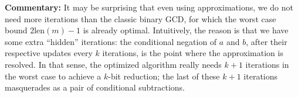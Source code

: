 \documentclass{llncs}
\newcommand{\bitlength}{\text{len}}
\begin{document}
\vspace{2ex}
\noindent\textsf{\textbf{Commentary:}} It may be surprising that even
using approximations, we do not need more iterations than the classic
binary GCD, for which the worst case bound $2\bitlength(m)-1$ is
already optimal. Intuitively, the reason is that we have some extra
``hidden'' iterations: the conditional negation of $a$ and $b$,
after their respective updates every $k$ iterations, is the point where
the approximation is resolved. In that sense, the optimized algorithm
really needs $k+1$ iterations in the worst case to achieve a $k$-bit
reduction; the last of these $k+1$ iterations masquerades as a
pair of conditional subtractions.
\end{document}
